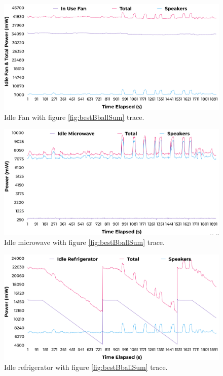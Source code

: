 \begin{figure}[H]
  \centering
  \includegraphics[width=1\textwidth]{figures/inUseFanNoise.png}
  \caption{Idle Fan with figure \ref{fig:bestBballSum} trace.}
  \label{fig:fanIdle}
\end{figure}

\begin{figure}[H]
  \centering
  \includegraphics[width=1\textwidth]{figures/idleuWaveNoise.png}
  \caption{Idle microwave with figure \ref{fig:bestBballSum} trace.}
  \label{fig:uWaveIdle}
\end{figure}

\begin{figure}[H]
  \centering
  \includegraphics[width=1\textwidth]{figures/idleFridgeNoise.png}
  \caption{Idle refrigerator with figure \ref{fig:bestBballSum} trace.}
  \label{fig:fridgeIdle}
\end{figure}

